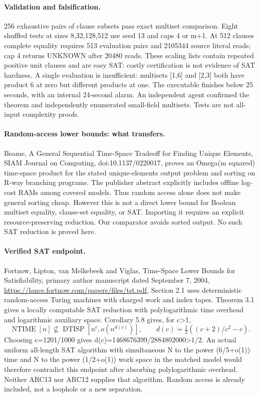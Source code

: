 \documentclass{article}
\begin{document}
\paragraph{Validation and falsification.}
256 exhaustive pairs of clause subsets pass exact multiset comparison.
Eight shuffled tests at sizes 8,32,128,512 use seed 13 and caps 4 or m+1.
At 512 clauses complete equality requires 513 evaluation pairs and 2105344
source literal reads; cap 4 returns UNKNOWN after 20480 reads.
These scaling lists contain repeated positive unit clauses and are easy
SAT: costly certification is not evidence of SAT hardness.
A single evaluation is insufficient: multisets [1,6] and [2,3] both have
product 6 at zero but different products at one.
The executable finishes below 25 seconds, with an internal 24-second alarm.
An independent agent confirmed the theorem and independently enumerated
small-field multisets. Tests are not all-input complexity proofs.

\paragraph{Random-access lower bounds: what transfers.}
Beame, A General Sequential Time-Space Tradeoff for Finding Unique Elements,
SIAM Journal on Computing, doi:10.1137/0220017, proves an
Omega(m squared) time-space product for the stated unique-elements output
problem and sorting on R-way branching programs. The publisher abstract
explicitly includes offline log-cost RAMs among covered models.
Thus random access alone does not make general sorting cheap.
However this is not a direct lower bound for Boolean multiset equality,
clause-set equality, or SAT. Importing it requires an explicit
resource-preserving reduction. Our comparator avoids sorted output.
No such SAT reduction is proved here.

\paragraph{Verified SAT endpoint.}
Fortnow, Lipton, van Melkebeek and Viglas, Time-Space Lower Bounds for
Satisfiability, primary author manuscript dated September 7, 2004,
\url{https://lance.fortnow.com/papers/files/tst.pdf},
Section 2.1 uses deterministic random-access Turing machines with charged
work and index tapes. Theorem 3.1 gives a locally computable SAT reduction
with polylogarithmic time overhead and logarithmic auxiliary space.
Corollary 5.8 gives, for c>1,
\[
 \operatorname{NTIME}[n]\not\subseteq
 \operatorname{DTISP}[n^c,o(n^{d(c)})],\qquad
 d(c)=\tfrac12((c+2)/c^2-c).
\]
Choosing c=1201/1000 gives
d(c)=1468676399/2884802000>1/2. An actual uniform all-length SAT algorithm
with simultaneous N to the power (6/5+o(1)) time and
N to the power (1/2+o(1)) work space in the matched model would therefore
contradict this endpoint after absorbing polylogarithmic overhead.
Neither ARC13 nor ARC12 supplies that algorithm.
Random access is already included, not a loophole or a new separation.
\end{document}
